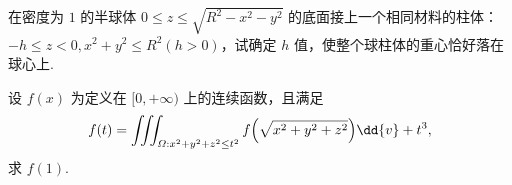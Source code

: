 	\begin{ti}
		在密度为 $1$ 的半球体 $0 \leq z \leq \sqrt{R^{2} - x^{2} - y^{2}}$ 的底面接上一个相同材料的柱体：$-h \leq z < 0, x^{2} + y^{2} \leq R^{2} (h > 0)$，试确定 $h$ 值，使整个球柱体的重心恰好落在球心上.
	\end{ti}

	\begin{ti}
		设 $f(x)$ 为定义在 $[0,+\infty)$ 上的连续函数，且满足
		\[
			f(t) = \iiint_{\varOmega: x^{2} + y^{2} + z^{2} \leq t^{2}} f \Bigl( \sqrt{x^{2} + y^{2} + z^{2}} \Bigr) \dd{v} + t^{3},
		\]
		求 $f(1)$.
	\end{ti}